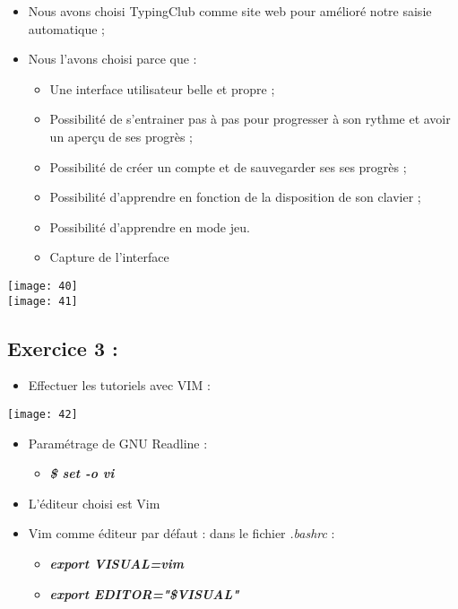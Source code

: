 \documentclass[a4paper]{article}
\begin{document}
\begin{itemize}
    \item Nous avons choisi TypingClub comme site web pour amélioré notre saisie automatique ;
    \item Nous l'avons choisi parce que : 
    \begin{itemize}
        \item Une interface utilisateur belle et propre ;
        \item Possibilité de s'entrainer pas à pas pour progresser à son rythme et avoir un aperçu de ses progrès ;
        \item Possibilité de créer un compte et de sauvegarder ses ses progrès ;
        \item Possibilité d'apprendre en fonction de la disposition de son clavier ;
        \item Possibilité d'apprendre en mode jeu. 
        \item Capture de l'interface
    \end{itemize}
    
\end{itemize}

\begin{center}
	\texttt{[image: 40]} \\
	\hfill \break
	\hfill \break
	\texttt{[image: 41]}
\end{center}

\subsection{Exercice 3 :}
	\begin{itemize}
		\item Effectuer les tutoriels avec VIM :
	\end{itemize}
	\begin{center}
		\texttt{[image: 42]}
	\end{center}
	\begin{itemize}
		\item Paramétrage de GNU Readline :
			\begin{itemize}
				\item \textit{\textbf{\$ set -o vi}}
			\end{itemize}
		\item L'éditeur choisi est Vim
		\item  Vim comme éditeur par défaut : dans le fichier \textit{.bashrc} : 
			\begin{itemize}
			\item \textit{\textbf{export VISUAL=vim}}
			\item \textit{\textbf{export EDITOR="\$VISUAL"}}
		\end{itemize}
	\end{itemize}
	
\end{document}
